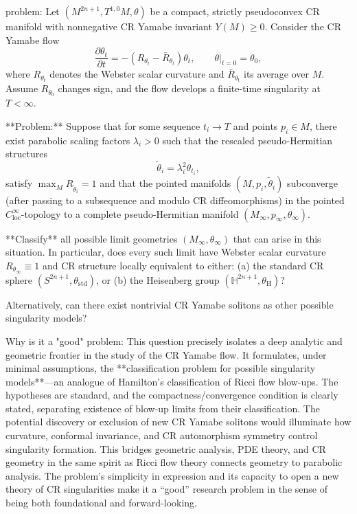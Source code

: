 problem:  
Let \((M^{2n+1}, T^{1,0}M, \theta)\) be a compact, strictly pseudoconvex CR manifold with nonnegative CR Yamabe invariant \(Y(M)\ge 0\).  
Consider the CR Yamabe flow  
\[
\frac{\partial \theta_t}{\partial t}=-(R_{\theta_t}-\bar{R}_{\theta_t})\theta_t,\qquad \theta|_{t=0}=\theta_0,
\]
where \(R_{\theta_t}\) denotes the Webster scalar curvature and \(\bar{R}_{\theta_t}\) its average over \(M\).  
Assume \(R_{\theta_0}\) changes sign, and the flow develops a finite-time singularity at \(T<\infty\).

**Problem:**  
Suppose that for some sequence \(t_i\to T\) and points \(p_i\in M\), there exist parabolic scaling factors \(\lambda_i>0\) such that the rescaled pseudo-Hermitian structures  
\[
\tilde{\theta}_i = \lambda_i^2 \theta_{t_i},
\]
satisfy \(\max_M R_{\tilde{\theta}_i}=1\) and that the pointed manifolds \((M,p_i,\tilde{\theta}_i)\) subconverge (after passing to a subsequence and modulo CR diffeomorphisms) in the pointed \(C^\infty_\text{loc}\)-topology to a complete pseudo-Hermitian manifold \((M_\infty,p_\infty,\theta_\infty)\).  

**Classify** all possible limit geometries \((M_\infty,\theta_\infty)\) that can arise in this situation.  
In particular, does every such limit have Webster scalar curvature \(R_{\theta_\infty}\equiv 1\) and CR structure locally equivalent to either:  
(a) the standard CR sphere \((S^{2n+1},\theta_{\mathrm{std}})\), or  
(b) the Heisenberg group \((\mathbb{H}^{2n+1},\theta_{\text{H}})\)?  

Alternatively, can there exist nontrivial CR Yamabe solitons as other possible singularity models?  

Why is it a "good" problem:  
This question precisely isolates a deep analytic and geometric frontier in the study of the CR Yamabe flow. It formulates, under minimal assumptions, the **classification problem for possible singularity models**—an analogue of Hamilton’s classification of Ricci flow blow-ups. The hypotheses are standard, and the compactness/convergence condition is clearly stated, separating existence of blow-up limits from their classification. The potential discovery or exclusion of new CR Yamabe solitons would illuminate how curvature, conformal invariance, and CR automorphism symmetry control singularity formation. This bridges geometric analysis, PDE theory, and CR geometry in the same spirit as Ricci flow theory connects geometry to parabolic analysis. The problem’s simplicity in expression and its capacity to open a new theory of CR singularities make it a “good” research problem in the sense of being both foundational and forward-looking.